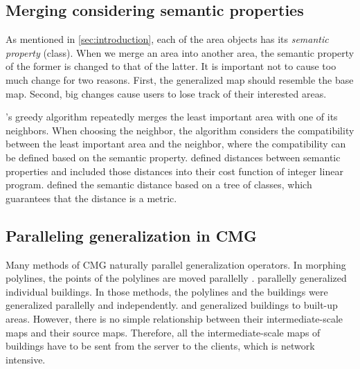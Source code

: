 \documentclass[]{interact}
\begin{document}




\subsection{Merging considering semantic properties}

As mentioned in \sect\ref{sec:introduction}, 
each of the area objects has its \emph{semantic property} (\ie class).
When we merge an area into another area, 
the semantic property of the former is changed to that of the latter.
It is important not to cause too much change for two reasons.
First, the generalized map should resemble the base map.
Second, big changes cause users to lose track of their interested areas.

's greedy algorithm repeatedly merges 
the least important area with one of its neighbors.
When choosing the neighbor, the algorithm considers 
the compatibility between the least important area and the neighbor,
where the compatibility can be defined based on the semantic property.
\citet{HaunertWolff2010AreaAgg} defined distances between semantic properties 
and included those distances into their cost function of integer linear program.
\citet{Peng2020AreaAgg} defined the semantic distance based on a tree of classes,
which guarantees that the distance is a metric.   




\subsection{Paralleling generalization in CMG}


Many methods of CMG naturally parallel generalization operators.
In morphing polylines, the points of the polylines are moved parallelly
\citep[\eg][]{Noellenburg2008,Li2017Annealing}.
\citet{Li2017_Building} parallelly generalized individual buildings.
In those methods, the polylines and the buildings 
were generalized parallelly and independently.
\citet{Peng2017Building} and \citet{Touya2017Progressive}
generalized buildings to built-up areas.
However, there is no simple relationship 
between their intermediate-scale maps and their source maps.
Therefore, all the intermediate-scale maps of buildings have to be
sent from the server to the clients,
which is network intensive.
\end{document}
